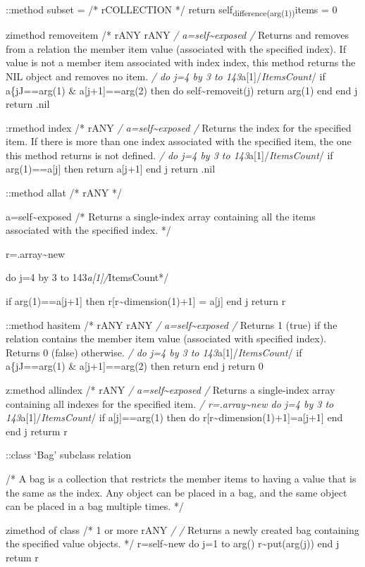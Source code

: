::method subset = /* rCOLLECTION */ return
self\textsubscript{difference(arg(1))}items = 0

zimethod removeitem /* rANY rANY \emph{/ a=self\textasciitilde exposed
/} Returns and removes from a relation the member item value (associated
with the specified index). If value is not a member item associated with
index index, this method returns the NIL object and removes no item.
\emph{/ do j=4 by 3 to 143}a{[}1{]}/\emph{ItemsCount}/ if a\{jJ==arg(1)
\& a{[}j+1{]}==arg(2) then do self\textasciitilde removeit(j) return
arg(1) end end j return .nil

:rmethod index /* rANY \emph{/ a=self\textasciitilde exposed /} Returns
the index for the specified item. If there is more than one index
associated with the specified item, the one this method returns is not
defined. \emph{/ do j=4 by 3 to 143}a{[}1{]}/\emph{ItemsCount}/ if
arg(1)==a{[}j{]} then return a{[}j+1{]} end j return .nil

::method allat /* rANY */

a=self\textasciitilde exposed /* Returns a single-index array containing
all the items associated with the specified index. */

r=.array\textasciitilde new

do j=4 by 3 to 143\emph{a{[}1{]}/}ItemsCount*/

if arg(1)==a{[}j+1{]} then r{[}r\textasciitilde dimension(1)+1{]} =
a{[}j{]} end j return r

::method hasitem /* rANY rANY \emph{/ a=self\textasciitilde exposed /}
Returns 1 (true) if the relation contains the member item value
(associated with specified index). Returns 0 (false) otherwise. \emph{/
do j=4 by 3 to 143}a{[}1{]}/\emph{ItemsCount}/ if a\{jJ==arg(1) \&
a{[}j+1{]}==arg(2) then return \textbar{} end j return 0

z:method allindex /* rANY \emph{/ a=self\textasciitilde exposed /}
Returns a single-index array containing all indexes for the specified
item. \emph{/ r=.array\textasciitilde new do j=4 by 3 to
143}a{[}1{]}/\emph{ItemsCount}/ if a{[}j{]}==arg(1) then do
r{[}r\textasciitilde dimension(1)+1{]}=a{[}j+1{]} end end j returm r

::class `Bag' subclass relation

/* A bag is a collection that restricts the member items to having a
value that is the same as the index. Any object can be placed in a bag,
and the same object can be placed in a bag multiple times. */

zimethod of class /* 1 or more rANY \emph{/ /} Returns a newly created
bag containing the specified value objects. */ r=self\textasciitilde new
do j=1 to arg() r\textasciitilde put(arg(j)) end j retum r

